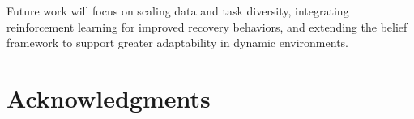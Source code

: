 \documentclass[conference]{IEEEtran}
\begin{document}
Future work will focus on scaling data and task diversity, integrating reinforcement learning for improved recovery behaviors, and extending the belief framework to support greater adaptability in dynamic environments.

\section{Acknowledgments}






\end{document}
